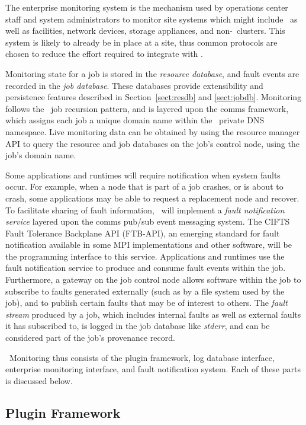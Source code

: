 The enterprise monitoring system is the mechanism used by operations center
staff and system administrators to monitor site systems which might include
\ngrm\ as well as facilities, network devices, storage appliances,
and non-\ngrm\ clusters.
This system is likely to already be in place at a site, thus common
protocols are chosen to reduce the effort required to integrate with \ngrm.

Monitoring state for a job is stored in the {\em resource database}, and
fault events are recorded in the {\em job database}.
These databases provide extensibility and persistence features described
in Section~\ref{sect:resdb} and \ref{sect:jobdb}.
Monitoring follows the \ngrm\ job recursion pattern, and is layered upon
the comms framework, which assigns each job a unique domain name within
the \ngrm\ private DNS namespace.
Live monitoring data can be obtained by using the resource
manager API to query the resource and job databases on the job's control
node, using the job's domain name.

Some applications and runtimes will require notification when system faults
occur.  For example, when a node that is part of a job crashes, or is about to
crash, some applications may be able to request a replacement node and recover.
To facilitate sharing of fault information, \ngrm\ will implement a
{\em fault notification service} layered upon the comms pub/sub event
messaging system.
The CIFTS Fault Tolerance Backplane API\cite{FTBAPI} (FTB-API), an emerging
standard for fault notification available in some MPI implementations and
other software, will be the programming interface to this service.
Applications and runtimes use the fault notification service to produce
and consume fault events within the job.  Furthermore, a gateway on the
job control node allows software within the job to subscribe to faults
generated externally (such as by a file system used by the job), and to
publish certain faults that may be of interest to others.
The {\em fault stream} produced by a job, which includes internal faults
as well as external faults it has subscribed to, is logged in the job database
like {\em stderr}, and can be considered part of the job's provenance record.

\ngrm\ Monitoring thus consists of
the plugin framework, 
log database interface,
enterprise monitoring interface,
and fault notification system.
Each of these parts is discussed below.

\subsection{Plugin Framework}

